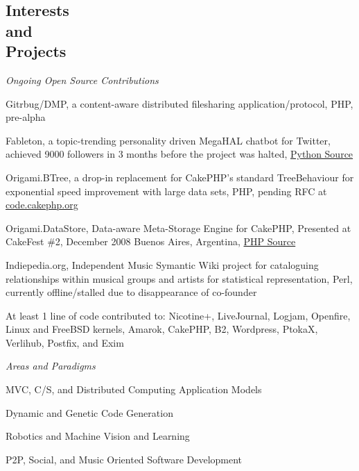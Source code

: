 \documentclass[margin,line]{resume}
\begin{document}
\begin{resume}
    \section{\mysidestyle Interests\\and\\Projects} 
    \textsl{Ongoing Open Source Contributions}\vspace{-4mm}\\%
    \begin{list2}
        \item Gitrbug/DMP, a content-aware distributed filesharing application/protocol, PHP, pre-alpha
        \item Fableton, a topic-trending personality driven MegaHAL chatbot for Twitter, achieved 9000 followers 
              in 3 months before the project was halted, \href{http://lexvegas.org/fableton.tgz}{Python Source}
        \item Origami.BTree, a drop-in replacement for CakePHP's standard TreeBehaviour for exponential speed 
              improvement with large data sets, PHP, pending RFC at 
              \href{http://code.cakephp.org/tickets/view/78}{code.cakephp.org}
        \item Origami.DataStore, Data-aware Meta-Storage Engine for CakePHP, Presented at CakeFest \#2, 
              December 2008 Buenos Aires, Argentina, \href{http://thechaw.com/origami/source/trunk}{PHP Source}
        \item Indiepedia.org, Independent Music Symantic Wiki project for cataloguing relationships within musical 
              groups and artists for statistical representation, Perl, currently offline/stalled due to 
              disappearance of co-founder
        \item At least 1 line of code contributed to: Nicotine+, LiveJournal, Logjam, Openfire, Linux and FreeBSD 
              kernels, Amarok, CakePHP, B2, Wordpress, PtokaX, Verlihub, Postfix, and Exim
    \end{list2}

    \textsl{Areas and Paradigms}\vspace{-4mm}\\%
    \begin{list2}
        \item MVC, C/S, and Distributed Computing Application Models
        \item Dynamic and Genetic Code Generation
        \item Robotics and Machine Vision and Learning
        \item P2P, Social, and Music Oriented Software Development
    \end{list2}


\end{resume}
\end{document}

